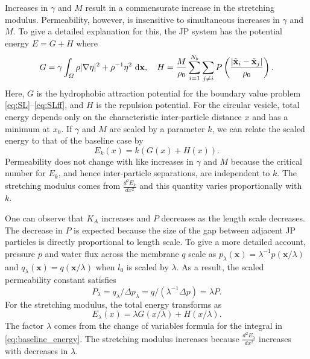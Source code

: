 \documentclass[lineno]{jfm}
\newcommand{\xx}{\mathbf{x}}
\begin{document}
Increases in $\gamma$ and $M$ result in
a commensurate increase in the stretching modulus. 
Permeability, however, is insensitive to simultaneous increases in $\gamma$ and $M$.
To give a detailed explanation for this, the JP system has the potential energy $E = G + H$ where 
\begin{equation}
\label{eq:baseline_energy}
G = \gamma \int_{\Omega} \rho |\nabla \eta |^2 + \rho^{-1} \eta ^2 \,\dif\xx,\quad H = \frac{M}{\rho_0} \sum_{i=1}^{N_b}\sum_{j \neq i} 
       P\left(\frac{|\tilde{\xx}_i - \tilde{\xx}_j|}{\rho_0}\right).
\end{equation}
Here, $G$ is the hydrophobic attraction potential for the boundary value problem \eqref{eq:SL}--\eqref{eq:SLff},
and $H$ is the repulsion potential.  
For the circular vesicle, total energy depends only on the characteristic inter-particle distance $x$
and has a minimum at $x_0$. 
If $\gamma$ and $M$ are scaled by a parameter $k$, 
we can relate the scaled energy to that of the baseline case by 
\[E_k(x) = k(G(x) + H(x)).\]
Permeability does not change with like increases in $\gamma$ and $M$
because the critical number for $E_k$, and hence inter-particle separations, are independent to $k$.
The stretching modulus comes from $\frac{d^2E_k}{dx^2}$ and this 
quantity varies proportionally with $k$. 

One can observe that $K_A$ increases and $P$ decreases as the length scale decreases. 
The decrease in  $P$ is expected because 
the size of the gap between adjacent JP particles is directly proportional to length scale.
To give a more detailed account, pressure $p$ and water flux across the membrane $q$ scale as 
$p_{\lambda}(\mathbf{x}) = \lambda^{-1} p(\mathbf{x}/\lambda)$ and 
$q_{\lambda}(\mathbf{x}) = q(\mathbf{x}/\lambda)$ 
when $l_0$ is scaled by $\lambda$. As a result, the scaled permeability constant satisfies 
\[
P_{\lambda} = q_{\lambda}/\Delta p_{\lambda} = q/(\lambda^{-1} \Delta p) = \lambda P.
\]
For the stretching modulus, the total energy transforms as 
\[E_{\lambda}(x) = \lambda G(x/\lambda) + H(x/\lambda ).\]
The factor $\lambda$ comes from the change of 
variables formula for the integral in \eqref{eq:baseline_energy}.
The stretching modulus increases because $\frac{d^2E_{\lambda}}{dx^2}$ increases with decreases in $\lambda.$ 
\end{document}
